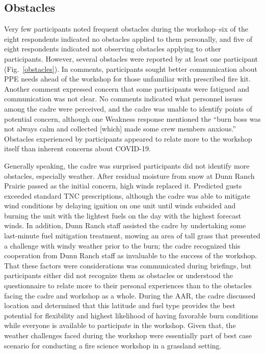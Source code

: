 \documentclass[fire,article,submit,moreauthors,pdftex]{Definitions/mdpi}
\begin{document}
\subsection{Obstacles}

Very few participants noted frequent obstacles during the workshop--six of the eight respondents indicated no obstacles applied to them personally, and five of eight respondents indicated not observing obstacles applying to other participants.
However, several obstacles were reported by at least one participant (Fig.~\ref{obstacles}).
In comments, participants sought better communication about PPE needs ahead of the workshop for those unfamiliar with prescribed fire kit.
Another comment expressed concern that some participants were fatigued and communication was not clear.
No comments indicated what personnel issues among the cadre were perceived, and the cadre was unable to identify points of potential concern, although one Weakness response mentioned the ``burn boss was not always calm and collected {[}which{]} made some crew members anxious.''
Obstacles experienced by participants appeared to relate more to the workshop itself than inherent concerns about COVID-19.

Generally speaking, the cadre was surprised participants did not identify more obstacles, especially weather.
After residual moisture from snow at Dunn Ranch Prairie passed as the initial concern, high winds replaced it.
Predicted gusts exceeded standard TNC prescriptions, although the cadre was able to mitigate wind conditions by delaying ignition on one unit until winds subsided and burning the unit with the lightest fuels on the day with the highest forecast winds.
In addition, Dunn Ranch staff assisted the cadre by undertaking some last-minute fuel mitigation treatment, mowing an area of tall grass that presented a challenge with windy weather prior to the burn; the cadre recognized this cooperation from Dunn Ranch staff as invaluable to the success of the workshop.
That these factors were considerations was communicated during briefings, but participants either did not recognize them as obstacles or understood the questionnaire to relate more to their personal experiences than to the obstacles facing the cadre and workshop as a whole.
During the AAR, the cadre discussed location and determined that this latitude and fuel type provides the best potential for flexibility and highest likelihood of having favorable burn conditions while everyone is available to participate in the workshop. 
Given that, the weather challenges faced during the workshop were essentially part of best case scenario for conducting a fire science workshop in a grassland setting.
\end{document}
